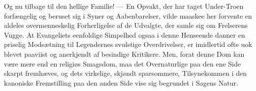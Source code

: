 \documentclass[12pt,a4paper]{book}
\begin{document}
Og nu tilbage til den hellige Familie! --- En Opvakt, der har taget Under-Troen
forfængelig og beruset sig i Syner og Aabenbarelser, vilde maaskee her forvente
en aldeles overmenneskelig Forherligelse af de Udvalgte, der samle sig om
Frelserens Vugge. At Evangeliets eenfoldige Simpelhed ogsaa i denne Henseende
danner en priselig Modsætning til Legendernes svulstige Overdrivelser, er
imidlertid ofte
uok blevet paaviist og anerkjendt af besindige Kritikere. Men, forat denne Dom
kan være mere end en religiøs
Smagsdom, maa det Overnaturlige paa den ene Side skarpt fremhæves, og dets
virkelige, skjøndt sparsommere, Tilsynekommen i den kanoniske Fremstilling paa
den anden Side vise sig begrundet i Sagens Natur.
\end{document}

